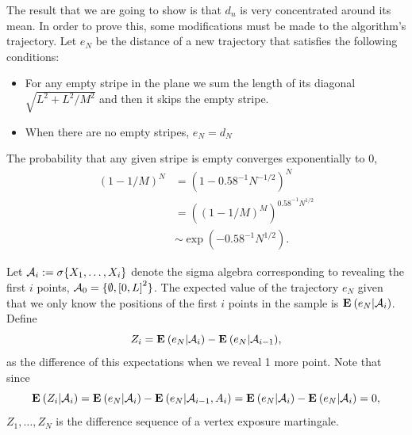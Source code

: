 The result that we are going to show is that $d_n$ is very concentrated around its mean. In order to prove this, some modifications must be made to the algorithm's trajectory. Let $e_N$ be the distance of a new trajectory that satisfies the following conditions:
\begin{itemize}
    \item For any empty stripe in the plane we sum the length of its diagonal $\sqrt{L^2+ L^2/M^2}$ and then it skips the empty stripe.
    \item When there are no empty stripes, $e_N = d_N$ 
\end{itemize}
 The probability that any given stripe is empty converges exponentially to 0,
\[ \begin{array}{rl}
    {(1- 1/M)}^N & = {(1- 0.58^{-1} N^{-1/2})}^N\\[1em]
    & = {\left({(1- 1/M)}^{M}\right)}^{0.58^{-1} N^{1/2}}\\[1em]
    &  \sim \exp(-0.58^{-1} N^{1/2}).
\end{array} \] 


Let $\mathcal{A}_i := \sigma\{X_1,\ldots,X_i\}$ denote the sigma algebra corresponding to revealing the first $i$ points, $\mathcal{A}_0 = \{\emptyset, {[0,L]}^2\}$. The expected value of the trajectory $e_N$ given that we only know the positions of the first $i$ points in the sample is $\mathbf{E}\: (e_N | \mathcal{A}_i)$. Define
\[ Z_i = \mathbf{E}\: (e_N | \mathcal{A}_i) - \mathbf{E}\: (e_N | \mathcal{A}_{i-1}),  \]  
as the difference of this expectations when we reveal 1 more point. Note that since
\[ \mathbf{E}\:(Z_i | \mathcal{A}_i) =  \mathbf{E}\: (e_N | \mathcal{A}_i) - \mathbf{E}\: (e_N | \mathcal{A}_{i-1}, A_i) = \mathbf{E}\: (e_N | \mathcal{A}_i) - \mathbf{E}\: (e_N | \mathcal{A}_i) = 0,\] 
$Z_1, \ldots, Z_N$ is the difference sequence of a vertex exposure martingale.



